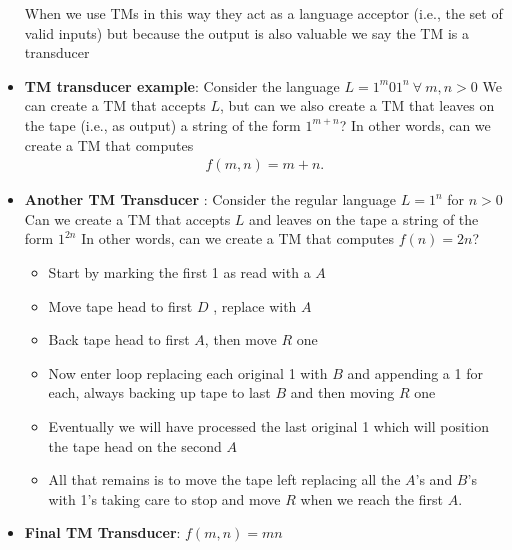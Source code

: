 \documentclass{report}
\begin{document}
\begin{itemize}
            When we use TMs in this way they act as a language acceptor (i.e., the set of valid inputs) but because the output is also valuable we say the TM is a transducer
        \item \textbf{TM transducer example}: Consider the language $L = 1^{m}01^{n} \ \forall \ m,n > 0 $
            \bigbreak \noindent 
            We can create a TM that accepts $L$, but can we also create a TM that leaves on the tape (i.e., as output) a string of the form $1^{m+n}$?
            \bigbreak \noindent 
            In other words, can we create a TM that computes
            \begin{align*}
                f(m,n) = m + n
            .\end{align*}
            \pagebreak \bigbreak \noindent 
            \begin{figure}[ht]
                \centering
                \label{fig:t5}
            \end{figure}
        \item \textbf{Another TM Transducer }: Consider the regular language $L = 1^{n}$ for $n > 0$
            \bigbreak \noindent 
            Can we create a TM that accepts $L$ and leaves on the tape a string of the form $1^{2n} $
            \bigbreak \noindent 
            In other words, can we create a TM that computes $f(n) = 2n$?
            \begin{itemize}
                \item Start by marking the first 1 as read with a $A$
                \item Move tape head to first $D$ , replace with $A$
                \item Back tape head to first $A$, then move $R$ one
                \item Now enter loop replacing each original 1 with $B$ and appending a 1 for each, always backing up tape to last $B$ and then moving $R$ one
                \item Eventually we will have processed the last original 1 which will position the tape head on the second $A$
                \item All that remains is to move the tape left replacing all the $A $’s and $B$’s with 1’s taking care to stop and move $R$ when we reach the first $A$.
            \end{itemize}
            \bigbreak \noindent 
        \item \textbf{Final TM Transducer}: $f(m,n) = mn$

\end{itemize}
\end{document}
